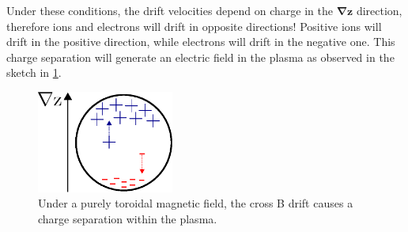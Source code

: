 \documentclass[10pt,a4paper]{article}
\begin{document}
		Under these conditions, the drift velocities depend on charge in the $\bm{\nabla z}$ direction, therefore ions and electrons will drift in opposite directions! Positive ions will drift in the positive direction, while electrons will drift in the negative one. This charge separation will generate an electric field in the plasma as observed in the sketch in \cref{f:efield}.
		\begin{figure}[h!]
			\centering
			\includegraphics[width=0.4\textwidth]{drift.eps}
			\caption{Under a purely toroidal magnetic field, the cross B drift causes a charge separation within the plasma.}
			\label{f:efield}
		\end{figure}
\end{document}

